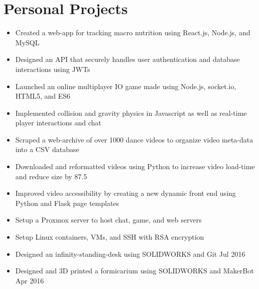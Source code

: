 \documentclass{resume}
\begin{document}
\section{Personal Projects}
\begin{itemize}
    \item Created a web-app for tracking macro nutrition using React.js, Node.js, and MySQL
    \item Designed an API that securely handles user authentication and database interactions using JWTs
\end{itemize}
\begin{itemize}
    \item Launched an online multiplayer IO game made using Node.js, socket.io, HTML5, and ES6
    \item Implemented collision and gravity physics in Javascript as well as real-time player interactions and chat
\end{itemize}
\begin{itemize}
    \item Scraped a web-archive of over 1000 dance videos to organize video meta-data into a CSV database
    \item Downloaded and reformatted videos using Python to increase video load-time and reduce size by 87.5%
    \item Improved video accessibility by creating a new dynamic front end using Python and Flask page templates
\end{itemize}
\begin{itemize}
    \item Setup a Proxmox server to host chat, game, and web servers
    \item Setup Linux containers, VMs, and SSH with RSA encryption
\end{itemize}
\begin{itemize}
    \item Designed an infinity-standing-desk using SOLIDWORKS and Git \hfill Jul 2016
    \item Designed and 3D printed a formicarium using SOLIDWORKS and MakerBot	\hfill Apr 2016
\end{itemize}
\end{document}
